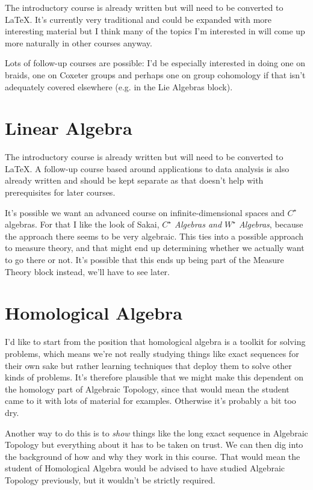 \documentclass[article]{article}
\begin{document}
The introductory course is already written but will need to be converted to \LaTeX. It's currently very traditional and could be expanded with more interesting material but I think many of the topics I'm interested in will come up more naturally in other courses anyway.

Lots of follow-up courses are possible: I'd be especially interested in doing one on braids, one on Coxeter groups and perhaps one on group cohomology if that isn't adequately covered elsewhere (e.g. in the Lie Algebras block).

\section{Linear Algebra}

The introductory course is already written but will need to be converted to \LaTeX. A follow-up course based around applications to data analysis is also already written and should be kept separate as that doesn't help with prerequisites for later courses.

It's possible we want an advanced course on infinite-dimensional spaces and $C^\star$ algebras. For that I like the look of Sakai, \textit{$C^\star$ Algebras and $W^\star$ Algebras}, because the approach there seems to be very algebraic. This ties into a possible approach to measure theory, and that might end up determining whether we actually want to go there or not. It's possible that this ends up being part of the Measure Theory block instead, we'll have to see later.

\section{Homological Algebra}

I'd like to start from the position that homological algebra is a toolkit for solving problems, which means we're not really studying things like exact sequences for their own sake but rather learning techniques that deploy them to solve other kinds of problems. It's therefore plausible that we might make this dependent on the homology part of Algebraic Topology, since that would mean the student came to it with lots of material for examples. Otherwise it's probably a bit too dry.

Another way to do this is to \emph{show} things like the long exact sequence in Algebraic Topology but everything about it has to be taken on trust. We can then dig into the background of how and why they work in this course. That would mean the student of Homological Algebra would be advised to have studied Algebraic Topology previously, but it wouldn't be strictly required.
\end{document}
